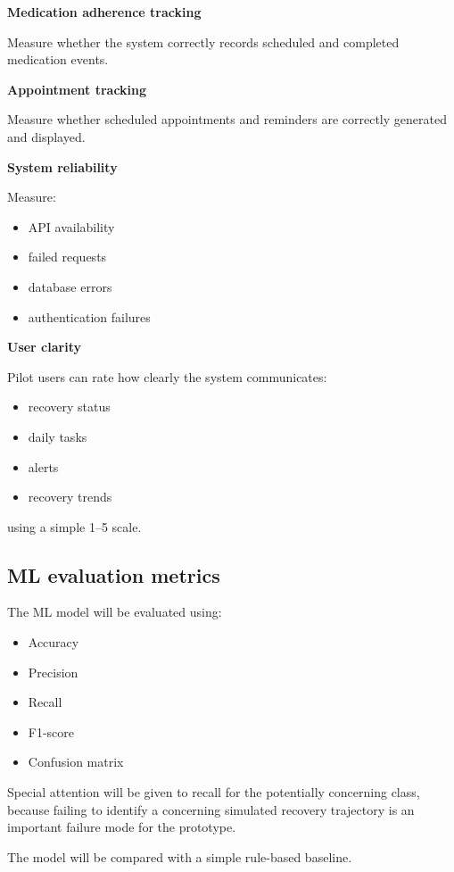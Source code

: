 \documentclass[11pt,a4paper]{article}
\begin{document}
\textbf{Medication adherence tracking}

Measure whether the system correctly records scheduled and
completed medication events.

\textbf{Appointment tracking}

Measure whether scheduled appointments and reminders are
correctly generated and displayed.

\textbf{System reliability}

Measure:
\begin{itemize}[leftmargin=0.7cm]
    \item API availability
    \item failed requests
    \item database errors
    \item authentication failures
\end{itemize}

\textbf{User clarity}

Pilot users can rate how clearly the system communicates:
\begin{itemize}[leftmargin=0.7cm]
    \item recovery status
    \item daily tasks
    \item alerts
    \item recovery trends
\end{itemize}

using a simple 1--5 scale.

\subsection{ML evaluation metrics}

The ML model will be evaluated using:
\begin{itemize}[leftmargin=0.7cm]
    \item Accuracy
    \item Precision
    \item Recall
    \item F1-score
    \item Confusion matrix
\end{itemize}

Special attention will be given to recall for the
potentially concerning class, because failing to identify a concerning
simulated recovery trajectory is an important failure mode for the prototype.

The model will be compared with a simple rule-based baseline.
\end{document}
